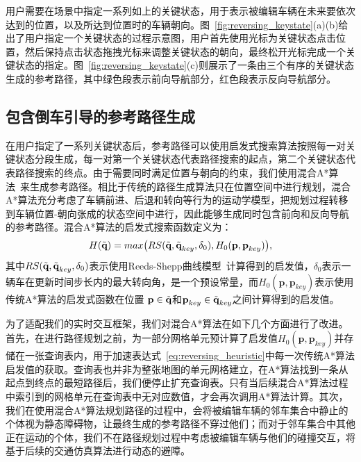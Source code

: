 用户需要在场景中指定一系列如上的关键状态，用于表示被编辑车辆在未来要依次达到的位置，以及所达到位置时的车辆朝向。图~\ref{fig:reversing_keystate}(a)(b)给出了用户指定一个关键状态的过程示意图，用户首先使用光标为关键状态点击位置，然后保持点击状态拖拽光标来调整关键状态的朝向，最终松开光标完成一个关键状态的指定。图~\ref{fig:reversing_keystate}(c)则展示了一条由三个有序的关键状态生成的参考路径，其中绿色段表示前向导航部分，红色段表示反向导航部分。



\subsection{包含倒车引导的参考路径生成}
\label{section:reversing_planning}

在用户指定了一系列关键状态后，参考路径可以使用启发式搜索算法按照每一对关键状态分段生成，每一对第一个关键状态代表路径搜索的起点，第二个关键状态代表路径搜索的终点。由于需要同时满足位置与朝向的约束，我们使用混合A*算法~\cite{dolgov2008practical}来生成参考路径。相比于传统的路径生成算法只在位置空间中进行规划，混合A*算法充分考虑了车辆前进、后退和转向等行为的运动学模型，把规划过程转移到车辆位置-朝向张成的状态空间中进行，因此能够生成同时包含前向和反向导航的参考路径。混合A*算法的启发式搜索函数定义为：
\begin{equation}
\setlength\abovedisplayskip{10pt}
\setlength\belowdisplayskip{10pt}
\label{eq:reversing_heuristic}
    H(\Tilde{\textbf{q}}) = max\big( RS(\Tilde{\textbf{q}}, \Tilde{\textbf{q}}_{key}, \delta_{0}), H_{0}(\textbf{p}, \textbf{p}_{key}) \big),
\end{equation}
其中$RS(\Tilde{\textbf{q}}, \Tilde{\textbf{q}}_{key}, \delta_{0})$表示使用Reeds-Shepp曲线模型~\cite{reeds1990optimal}计算得到的启发值，$\delta_{0}$表示一辆车在更新时间步长内的最大转向角，是一个预设常量，而$H_{0}(\textbf{p}, \textbf{p}_{key})$表示使用传统A*算法的启发式函数在位置 $\textbf{p} \in \Tilde{\textbf{q}}$和$\textbf{p}_{key} \in \Tilde{\textbf{q}}_{key}$之间计算得到的启发值。

为了适配我们的实时交互框架，我们对混合A*算法在如下几个方面进行了改进。首先，在进行路径规划之前，为一部分网格单元预计算了启发值$H_{0}(\textbf{p}, \textbf{p}_{key})$并存储在一张查询表内，用于加速表达式~\ref{eq:reversing_heuristic}中每一次传统A*算法启发值的获取。查询表也并非为整张地图的单元网格建立，在A*算法找到一条从起点到终点的最短路径后，我们便停止扩充查询表。只有当后续混合A*算法过程中索引到的网格单元在查询表中无对应数值，才会再次调用A*算法计算。其次，我们在使用混合A*算法规划路径的过程中，会将被编辑车辆的邻车集合中静止的个体视为静态障碍物，让最终生成的参考路径不穿过他们；而对于邻车集合中其他正在运动的个体，我们不在路径规划过程中考虑被编辑车辆与他们的碰撞交互，将基于后续的交通仿真算法进行动态的避障。

